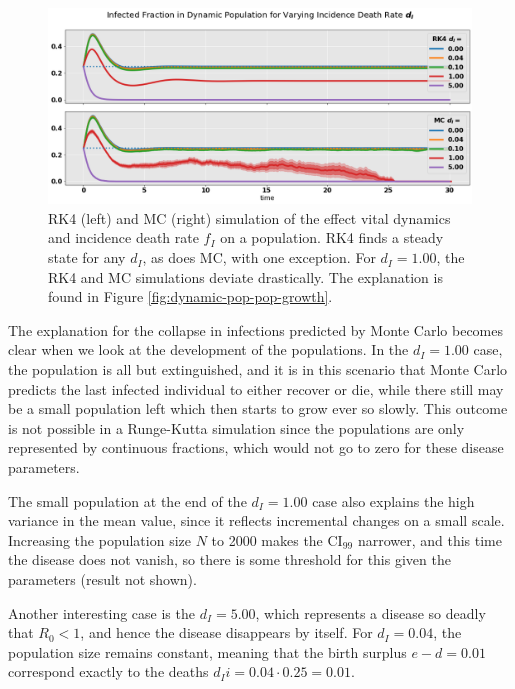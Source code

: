 \documentclass[]{article}
\begin{document}
\begin{figure}[!h]
	\centering
	\includegraphics[width=1\linewidth]{./figs/dynamic-pop-infected-ratio.png}
	\caption{RK4 (left) and MC (right) simulation of the effect vital dynamics and incidence death rate $f_I$ on a population. RK4 finds a steady state for any $d_I$, as does MC, with one exception. For $d_I = 1.00$, the RK4 and MC simulations deviate drastically. The explanation is found in Figure \ref{fig:dynamic-pop-pop-growth}.}
	\label{fig:dynamic-pop-infected-ratio}
\end{figure}

The explanation for the collapse in infections predicted by Monte Carlo becomes clear when we look at the development of the populations. In the $d_I=1.00$ case, the population is all but extinguished, and it is in this scenario that Monte Carlo predicts the last infected individual to either recover or die, while there still may be a small population left which then starts to grow ever so slowly. This outcome is not possible in a Runge-Kutta simulation since the populations are only represented by continuous fractions, which would not go to zero for these disease parameters.

The small population at the end of the $d_I=1.00$ case also explains the high variance in the mean value, since it reflects incremental changes on a small scale. Increasing the population size $N$ to 2000 makes the CI$_{99}$ narrower, and this time the disease does not vanish, so there is some threshold for this given the parameters (result not shown).

Another interesting case is the $d_I=5.00$, which represents a disease so deadly that $R_0 < 1$, and hence the disease disappears by itself. For $d_I=0.04$, the population size remains constant, meaning that the birth surplus $e-d = 0.01$ correspond exactly to the deaths $d_Ii = 0.04 \cdot 0.25 = 0.01$.
\end{document}
